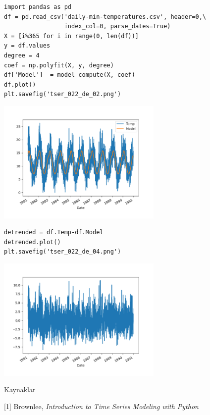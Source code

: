 \documentclass[12pt,fleqn]{article}\usepackage{../../common}
\begin{document}
\begin{verbatim}
import pandas as pd
df = pd.read_csv('daily-min-temperatures.csv', header=0,\
                 index_col=0, parse_dates=True)
X = [i%365 for i in range(0, len(df))]
y = df.values
degree = 4
coef = np.polyfit(X, y, degree)
df['Model']  = model_compute(X, coef)
df.plot()
plt.savefig('tser_022_de_02.png')
\end{verbatim}


\includegraphics[height=6cm]{tser_022_de_02.png}

\begin{verbatim}
detrended = df.Temp-df.Model
detrended.plot()
plt.savefig('tser_022_de_04.png')
\end{verbatim}


\includegraphics[height=6cm]{tser_022_de_04.png}





 












Kaynaklar

[1] Brownlee, {\em Introduction to Time Series Modeling with Python}
\end{document}
